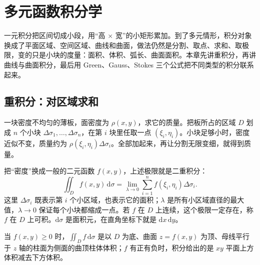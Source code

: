 \providecommand{\chninefigcap}[1]{\nopagebreak[4]\par\noindent\centerline{#1}\par\vspace{0.35em}}

\section{多元函数积分学}

一元积分把区间切成小段，用“高 $\times$ 宽”的小矩形累加。到了多元情形，积分对象换成了平面区域、空间区域、曲线和曲面，做法仍然是分割、取点、求和、取极限，变的只是小块的度量：面积、体积、弧长、曲面面积。本章先讲重积分，再讲曲线与曲面积分，最后用 Green、Gauss、Stokes 三个公式把不同类型的积分联系起来。

\subsection{重积分：对区域求和}

一块密度不均匀的薄板，面密度为 $\rho(x,y)$，求它的质量。把板所占的区域 $D$ 划成 $n$ 个小块 $\Delta\sigma_1,\dots,\Delta\sigma_n$，在第 $i$ 块里任取一点 $(\xi_i,\eta_i)$。小块足够小时，密度近似不变，质量约为 $\rho(\xi_i,\eta_i)\Delta\sigma_i$。全部加起来，再让分割无限变细，就得到质量。

把“密度”换成一般的二元函数 $f(x,y)$，上述极限就是二重积分：
\[
    \iint_D f(x,y)\,\mathrm d\sigma
    =\lim_{\lambda\to0}\sum_{i=1}^{n}f(\xi_i,\eta_i)\Delta\sigma_i .
\]
这里 $\Delta\sigma_i$ 既表示第 $i$ 个小区域，也表示它的面积；$\lambda$ 是所有小区域直径的最大值，$\lambda\to0$ 保证每个小块都缩成一点。若 $f$ 在 $D$ 上连续，这个极限一定存在，称 $f$ 在 $D$ 上可积。$\mathrm d\sigma$ 是面积元，在直角坐标下就是 $\mathrm dx\,\mathrm dy$。

当 $f(x,y)\ge0$ 时，$\iint_D f\,\mathrm d\sigma$ 是以 $D$ 为底、曲面 $z=f(x,y)$ 为顶、母线平行于 $z$ 轴的柱面为侧面的曲顶柱体体积；$f$ 有正有负时，积分给出的是 $xy$ 平面上方体积减去下方体积。

